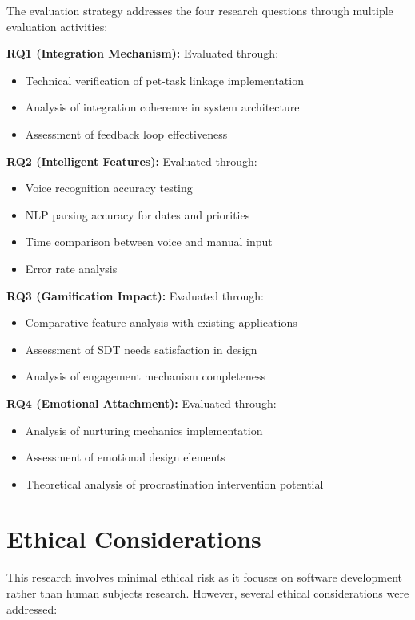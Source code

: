 \completed

The evaluation strategy addresses the four research questions through multiple evaluation activities:

\textbf{RQ1 (Integration Mechanism):} Evaluated through:
\begin{itemize}
    \item Technical verification of pet-task linkage implementation
    \item Analysis of integration coherence in system architecture
    \item Assessment of feedback loop effectiveness
\end{itemize}

\textbf{RQ2 (Intelligent Features):} Evaluated through:
\begin{itemize}
    \item Voice recognition accuracy testing
    \item NLP parsing accuracy for dates and priorities
    \item Time comparison between voice and manual input
    \item Error rate analysis
\end{itemize}

\textbf{RQ3 (Gamification Impact):} Evaluated through:
\begin{itemize}
    \item Comparative feature analysis with existing applications
    \item Assessment of SDT needs satisfaction in design
    \item Analysis of engagement mechanism completeness
\end{itemize}

\textbf{RQ4 (Emotional Attachment):} Evaluated through:
\begin{itemize}
    \item Analysis of nurturing mechanics implementation
    \item Assessment of emotional design elements
    \item Theoretical analysis of procrastination intervention potential
\end{itemize}

\section{Ethical Considerations}
\label{sec:ethical-considerations}

\completed

This research involves minimal ethical risk as it focuses on software development rather than human subjects research. However, several ethical considerations were addressed:

